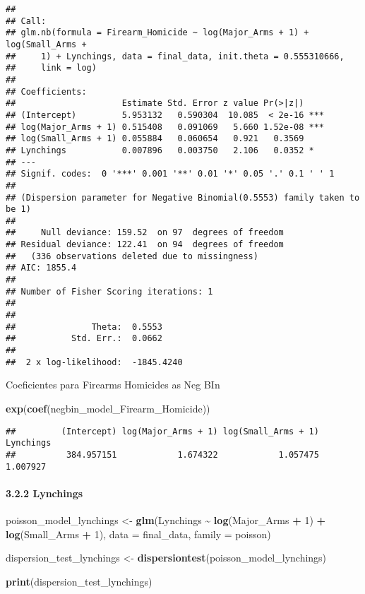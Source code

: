 \documentclass[
  11pt,
]{article}
\newenvironment{Shaded}{\begin{snugshade}}{\end{snugshade}}
\newcommand{\AttributeTok}[1]{\textcolor[rgb]{0.13,0.29,0.53}{#1}}
\newcommand{\DecValTok}[1]{\textcolor[rgb]{0.00,0.00,0.81}{#1}}
\newcommand{\FunctionTok}[1]{\textcolor[rgb]{0.13,0.29,0.53}{\textbf{#1}}}
\newcommand{\NormalTok}[1]{#1}
\newcommand{\OtherTok}[1]{\textcolor[rgb]{0.56,0.35,0.01}{#1}}
\newcommand{\SpecialCharTok}[1]{\textcolor[rgb]{0.81,0.36,0.00}{\textbf{#1}}}
\begin{document}
\begin{verbatim}
## 
## Call:
## glm.nb(formula = Firearm_Homicide ~ log(Major_Arms + 1) + log(Small_Arms + 
##     1) + Lynchings, data = final_data, init.theta = 0.555310666, 
##     link = log)
## 
## Coefficients:
##                     Estimate Std. Error z value Pr(>|z|)    
## (Intercept)         5.953132   0.590304  10.085  < 2e-16 ***
## log(Major_Arms + 1) 0.515408   0.091069   5.660 1.52e-08 ***
## log(Small_Arms + 1) 0.055884   0.060654   0.921   0.3569    
## Lynchings           0.007896   0.003750   2.106   0.0352 *  
## ---
## Signif. codes:  0 '***' 0.001 '**' 0.01 '*' 0.05 '.' 0.1 ' ' 1
## 
## (Dispersion parameter for Negative Binomial(0.5553) family taken to be 1)
## 
##     Null deviance: 159.52  on 97  degrees of freedom
## Residual deviance: 122.41  on 94  degrees of freedom
##   (336 observations deleted due to missingness)
## AIC: 1855.4
## 
## Number of Fisher Scoring iterations: 1
## 
## 
##               Theta:  0.5553 
##           Std. Err.:  0.0662 
## 
##  2 x log-likelihood:  -1845.4240
\end{verbatim}

Coeficientes para Firearms Homicides as Neg BIn

\begin{Shaded}
\begin{Highlighting}[]
\FunctionTok{exp}\NormalTok{(}\FunctionTok{coef}\NormalTok{(negbin\_model\_Firearm\_Homicide))}
\end{Highlighting}
\end{Shaded}

\begin{verbatim}
##         (Intercept) log(Major_Arms + 1) log(Small_Arms + 1)           Lynchings 
##          384.957151            1.674322            1.057475            1.007927
\end{verbatim}

\paragraph{3.2.2 Lynchings}\label{lynchings}

\begin{Shaded}
\begin{Highlighting}[]
\NormalTok{poisson\_model\_lynchings }\OtherTok{\textless{}{-}} \FunctionTok{glm}\NormalTok{(Lynchings }\SpecialCharTok{\textasciitilde{}} \FunctionTok{log}\NormalTok{(Major\_Arms }\SpecialCharTok{+} \DecValTok{1}\NormalTok{) }\SpecialCharTok{+} \FunctionTok{log}\NormalTok{(Small\_Arms }\SpecialCharTok{+} \DecValTok{1}\NormalTok{),                                 }
                               \AttributeTok{data =}\NormalTok{ final\_data, }\AttributeTok{family =}\NormalTok{ poisson)}

\NormalTok{dispersion\_test\_lynchings }\OtherTok{\textless{}{-}} \FunctionTok{dispersiontest}\NormalTok{(poisson\_model\_lynchings)}

\FunctionTok{print}\NormalTok{(dispersion\_test\_lynchings) }
\end{Highlighting}
\end{Shaded}
\end{document}
